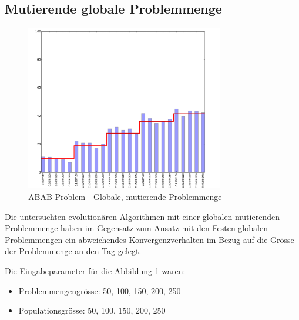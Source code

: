 \subsection{Mutierende globale Problemmenge}
\begin{figure}[h]
  \centering
  \includegraphics[width=0.77\textwidth]{images/E_G_abab_solved.pdf}
  \caption[ABAB Problem - Globale, mutierende Problemmenge]{ABAB Problem - Globale, mutierende Problemmenge}
  \label{fig:e_g_abab}
\end{figure}
Die untersuchten evolutionären Algorithmen mit einer globalen mutierenden Problemmenge haben im Gegensatz zum Ansatz mit den Festen globalen Problemmengen ein abweichendes Konvergenzverhalten im Bezug auf die Grösse der Problemmenge an den Tag gelegt.

Die Eingabeparameter für die Abbildung \ref{fig:e_g_abab} waren:
\begin{itemize}
	\item Problemmengengrösse: 50, 100, 150, 200, 250
	\item Populationsgrösse: 50, 100, 150, 200, 250
\end{itemize}


